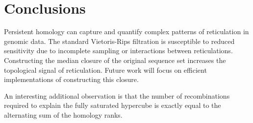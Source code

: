 
\section{Conclusions}
\label{sec:conclusion}

Persistent homology can capture and quantify complex patterns of reticulation in genomic data.
The standard Vietoris-Rips filtration is susceptible to reduced sensitivity due to incomplete sampling or interactions between reticulations.
Constructing the median closure of the original sequence set increases the topological signal of reticulation.
Future work will focus on efficient implementations of constructing this closure.

An interesting additional observation is that the number of recombinations required to explain the fully saturated hypercube is exactly equal to the alternating sum of the homology ranks.